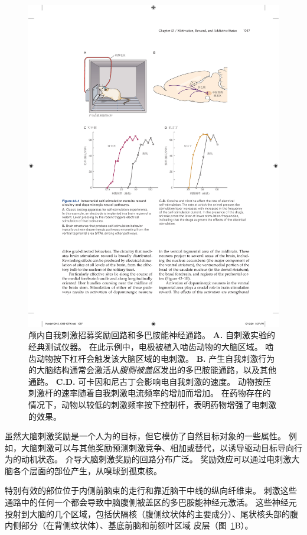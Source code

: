 \begin{figure}[htbp]
	\centering
	\includegraphics[width=0.8\linewidth]{chap43/fig_43_1}
	\caption{颅内自我刺激招募奖励回路和多巴胺能神经通路。
		\textbf{A.} 自刺激实验的经典测试仪器。
		在此示例中，电极被植入啮齿动物的大脑区域。
		啮齿动物按下杠杆会触发该大脑区域的电刺激。
		\textbf{B.} 产生自我刺激行为的大脑结构通常会激活从\textit{腹侧被盖区}发出的多巴胺能通路，以及其他通路。
		\textbf{C.D.} 可卡因和尼古丁会影响电自我刺激的速度。
		动物按压刺激杆的速率随着自我刺激电流频率的增加而增加。
		在药物存在的情况下，动物以较低的刺激频率按下控制杆，表明药物增强了电刺激的效果。}
	\label{fig:43_1}
\end{figure}


虽然大脑刺激奖励是一个人为的目标，但它模仿了自然目标对象的一些属性。
例如，大脑刺激可以与其他奖励预测刺激竞争、相加或替代，以诱导驱动目标导向行为的动机状态。
介导大脑刺激奖励的回路分布广泛。
奖励效应可以通过电刺激大脑各个层面的部位产生，从嗅球到孤束核。


特别有效的部位位于内侧前脑束的走行和靠近脑干中线的纵向纤维束。
刺激这些通路中的任何一个都会导致中脑腹侧被盖区的多巴胺能神经元激活。
这些神经元投射到大脑的几个区域，包括伏隔核（腹侧纹状体的主要成分）、尾状核头部的腹内侧部分（在背侧纹状体）、基底前脑和前额叶区域 皮层（图~\ref{fig:43_1}B）。


